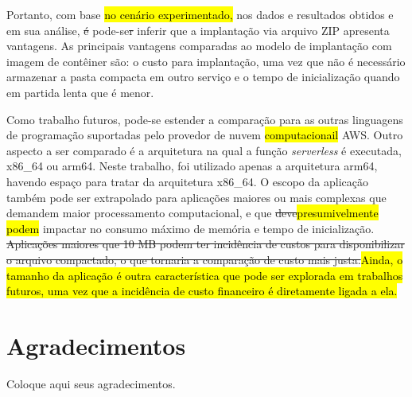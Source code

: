 \documentclass[10pt,conference]{IEEEtran}
\begin{document}
Portanto, com base \hl{no cenário experimentado,} nos dados e resultados obtidos e em sua análise, \st{é} pode-se\st{r} inferir que a implantação via arquivo ZIP apresenta vantagens. As principais vantagens comparadas ao modelo de implantação com imagem de contêiner são: o custo para implantação, uma vez que não é necessário armazenar a pasta compacta em outro serviço e o tempo de inicialização quando em partida lenta que é menor.  

Como trabalho futuros, pode-se estender a comparação para as outras linguagens de programação suportadas pelo provedor de nuvem \hl{computacionail} AWS. Outro aspecto a ser comparado é a arquitetura na qual a função \textit{serverless} é executada, x86\_64 ou arm64. Neste trabalho, foi utilizado apenas a arquitetura arm64, havendo espaço para tratar da arquitetura x86\_64. O escopo da aplicação também pode ser extrapolado para aplicações maiores ou mais complexas que demandem maior processamento computacional, e que \st{deve}\hl{presumivelmente podem} impactar no consumo máximo de memória e tempo de inicialização. \st{Aplicações maiores que 10 MB podem ter incidência de custos para disponibilizar o arquivo compactado, o que tornaria a comparação de custo mais justa.}\hl{Ainda, o tamanho da aplicação é outra característica que pode ser explorada em trabalhos futuros, uma vez que a incidência de custo financeiro é diretamente ligada a ela.}

%
%


\section*{Agradecimentos}

Coloque aqui seus agradecimentos.



\end{document}
